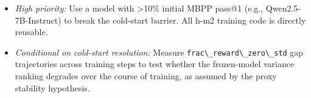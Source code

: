 \begin{itemize}
\item \textit{High priority:} Use a model with >10\% initial MBPP pass@1 (e.g., Qwen2.5-7B-Instruct) to break the cold-start barrier. All h-m2 training code is directly reusable.
\end{itemize}

\begin{itemize}
\item \textit{Conditional on cold-start resolution:} Measure \texttt{frac\textbackslash \_reward\textbackslash \_zero\textbackslash \_std} gap trajectories across training steps to test whether the frozen-model variance ranking degrades over the course of training, as assumed by the proxy stability hypothesis.
\end{itemize}

